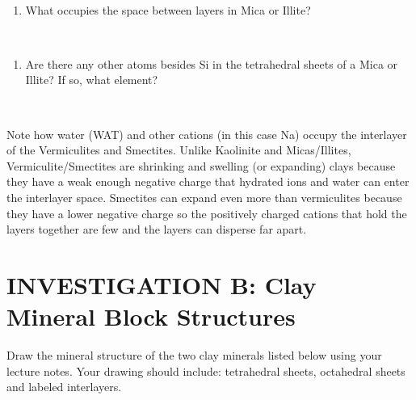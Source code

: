 \documentclass[
  letterpaper,
  twocolumn,
  portrait]{scrbook}
\providecommand{\tightlist}{%
  \setlength{\itemsep}{0pt}\setlength{\parskip}{0pt}}\usepackage{longtable,booktabs,array}
\begin{document}
~ ~ ~

\begin{enumerate}
\def\labelenumi{\arabic{enumi}.}
\setcounter{enumi}{5}
\tightlist
\item
  What occupies the space between layers in Mica or Illite?
\end{enumerate}

~ ~ ~

\begin{enumerate}
\def\labelenumi{\arabic{enumi}.}
\setcounter{enumi}{6}
\tightlist
\item
  Are there any other atoms besides Si in the tetrahedral sheets of a
  Mica or Illite? If so, what element?
\end{enumerate}

~ ~ ~

Note how water (WAT) and other cations (in this case Na) occupy the
interlayer of the Vermiculites and Smectites. Unlike Kaolinite and
Micas/Illites, Vermiculite/Smectites are shrinking and swelling (or
expanding) clays because they have a weak enough negative charge that
hydrated ions and water can enter the interlayer space. Smectites can
expand even more than vermiculites because they have a lower negative
charge so the positively charged cations that hold the layers together
are few and the layers can disperse far apart.

\hypertarget{investigation-b-clay-mineral-block-structures}{%
\section{INVESTIGATION B: Clay Mineral Block
Structures}\label{investigation-b-clay-mineral-block-structures}}

Draw the mineral structure of the two clay minerals listed below using
your lecture notes. Your drawing should include: tetrahedral sheets,
octahedral sheets and labeled interlayers.

 
  \providecommand{\huxb}[2]{\arrayrulecolor[RGB]{#1}\global\arrayrulewidth=#2pt}
  \providecommand{\huxvb}[2]{\color[RGB]{#1}\vrule width #2pt}
  \providecommand{\huxtpad}[1]{\rule{0pt}{#1}}
  \providecommand{\huxbpad}[1]{\rule[-#1]{0pt}{#1}}
\end{document}
